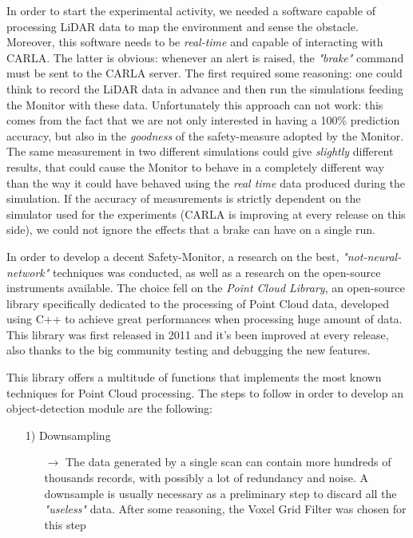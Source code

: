 In order to start the experimental activity, we needed a software capable of processing LiDAR data to map the environment and sense the obstacle. Moreover, this software needs to be \textsl{real-time} and capable of interacting with CARLA. The latter is obvious: whenever an alert is raised, the \textsl{"brake"} command must be sent to the CARLA server. The first required some reasoning: one could think to record the LiDAR data in advance and then run the simulations feeding the Monitor with these data. Unfortunately this approach can not work: this comes from the fact that we are not only interested in having a 100\% prediction accuracy, but also in the \textsl{goodness} of the safety-measure adopted by the Monitor. The same measurement in two different simulations could give \textsl{slightly} different results, that could cause the Monitor to behave in a completely different way than the way it could have behaved using the \textsl{real time} data produced during the simulation. If the accuracy of measurements is strictly dependent on the simulator used for the experiments (CARLA is improving at every release on this side), we could not ignore the effects that a brake can have on a single run.

In order to develop a decent Safety-Monitor, a research on the best, \textsl{"not-neural-network"} techniques was conducted, as well as a research on the open-source instruments available. The choice fell on the \textsl{Point Cloud Library}\cite{pcl}, an open-source library specifically dedicated to the processing of Point Cloud data, developed using C++ to achieve great performances when processing huge amount of data.
This library was first released in 2011\cite{pclwiki} and it's been improved at every release, also thanks to the big community testing and debugging the new features.

This library offers a multitude of functions that implements the most known techniques for Point Cloud processing. The steps to follow in order to develop an object-detection module are the following:

\begin{itemize}
	\item[1)] Downsampling
	\begin{itemize}
		\item[$\rightarrow$] The data generated by a single scan can contain more hundreds of thousands records, with possibly a lot of redundancy and noise. A downsample is usually necessary as a preliminary step to discard all the \textsl{"useless"} data. After some reasoning, the Voxel Grid Filter was chosen for this step
	\end{itemize}
\end{itemize}

